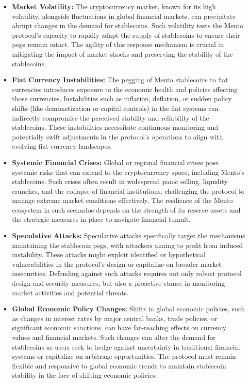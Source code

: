 \documentclass[a4paper]{article}
\theoremstyle{definition}
\begin{document}
\begin{itemize}
    \begin{itemize}
        \item \textbf{Market Volatility:} The cryptocurrency market, known for its high volatility, alongside fluctuations in global financial markets, can precipitate abrupt changes in the demand for stablecoins. Such volatility tests the Mento protocol's capacity to rapidly adapt the supply of stablecoins to ensure their pegs remain intact. The agility of this response mechanism is crucial in mitigating the impact of market shocks and preserving the stability of the stablecoins.
    
        \item \textbf{Fiat Currency Instabilities:} The pegging of Mento stablecoins to fiat currencies introduces exposure to the economic health and policies affecting those currencies. Instabilities such as inflation, deflation, or sudden policy shifts (like demonetization or capital controls) in the fiat systems can indirectly compromise the perceived stability and reliability of the stablecoins. These instabilities necessitate continuous monitoring and potentially swift adjustments in the protocol's operations to align with evolving fiat currency landscapes.
    
        \item \textbf{Systemic Financial Crises:} Global or regional financial crises pose systemic risks that can extend to the cryptocurrency space, including Mento's stablecoins. Such crises often result in widespread panic selling, liquidity crunches, and the collapse of financial institutions, challenging the protocol to manage extreme market conditions effectively. The resilience of the Mento ecosystem in such scenarios depends on the strength of its reserve assets and the strategic measures in place to navigate financial tumult.
    
        \item \textbf{Speculative Attacks:} Speculative attacks specifically target the mechanisms maintaining the stablecoin pegs, with attackers aiming to profit from induced instability. These attacks might exploit identified or hypothetical vulnerabilities in the protocol's design or capitalize on broader market insecurities. Defending against such attacks requires not only robust protocol design and security measures, but also a proactive stance in monitoring market activities and potential threats.
    
        \item \textbf{Global Economic Policy Changes:} Shifts in global economic policies, such as changes in interest rates by major central banks, trade policies, or significant economic sanctions, can have far-reaching effects on currency values and financial markets. Such changes can alter the demand for stablecoins as users seek to hedge against uncertainty in traditional financial systems or capitalize on arbitrage opportunities. The protocol must remain flexible and responsive to global economic trends to maintain stablecoin stability in the face of shifting economic policies.
        \end{itemize}
    

\end{itemize}
\end{document}
